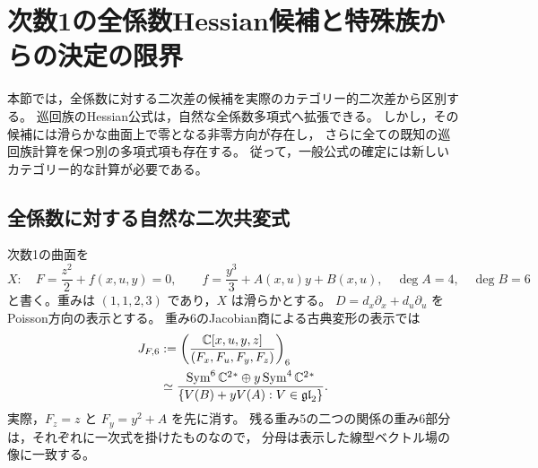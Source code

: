 \section{次数1の全係数Hessian候補と特殊族からの決定の限界}
\label{sec:kuznetsov-hessian-counterexample}

本節では，全係数に対する二次差の候補を実際のカテゴリー的二次差から区別する。
巡回族のHessian公式は，自然な全係数多項式へ拡張できる。
しかし，その候補には滑らかな曲面上で零となる非零方向が存在し，
さらに全ての既知の巡回族計算を保つ別の多項式項も存在する。
従って，一般公式の確定には新しいカテゴリー的な計算が必要である。

\subsection{全係数に対する自然な二次共変式}

次数1の曲面を
\begin{equation}\label{eq:ku-d1-full-hessian-model}
 X:\quad F=\frac{z^2}{2}+f(x,u,y)=0,
 \qquad f=\frac{y^3}{3}+A(x,u)y+B(x,u),
 \quad \deg A=4,\quad\deg B=6
\end{equation}
と書く。重みは $(1,1,2,3)$ であり，$X$ は滑らかとする。
$D=d_x\partial_x+d_u\partial_u$ をPoisson方向の表示とする。
重み6のJacobian商による古典変形の表示では
\begin{equation}\label{eq:ku-d1-reduced-jacobian}
 \begin{split}
 J_{F,6}
 &:=\left(\frac{\mathbb C[x,u,y,z]}{(F_x,F_u,F_y,F_z)}\right)_6\\
 &\simeq
 \frac{\operatorname{Sym}^6\mathbb C^2{}^*\oplus y\operatorname{Sym}^4\mathbb C^2{}^*}
 {\{V(B)+yV(A):V\in\mathfrak{gl}_2\}}.
 \end{split}
\end{equation}
実際，$F_z=z$ と $F_y=y^2+A$ を先に消す。
残る重み5の二つの関係の重み6部分は，それぞれに一次式を掛けたものなので，
分母は表示した線型ベクトル場の像に一致する。

